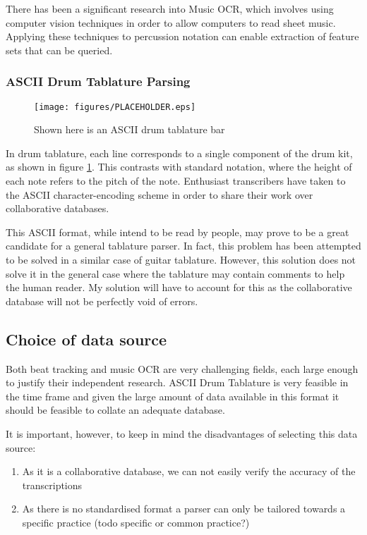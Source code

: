 \documentclass[12pt,twoside,notitlepage]{report}
\begin{document}
		There has been a significant research\cite{Johansen2009}\cite{BainbridgeBell2001} into Music OCR\footnotemark {}, which involves using computer vision techniques in order to allow computers to read sheet music. Applying these techniques to percussion notation can enable extraction of feature sets that can be queried.
		
			\subsubsection{ASCII Drum Tablature Parsing}
						\begin{figure}[h]
			\centerline{\texttt{[image: figures/PLACEHOLDER.eps]}}
			\caption{\label{DrumTablature} Shown here is an ASCII drum tablature bar}
\end{figure}
				In drum tablature, each line corresponds to a single component of the drum kit, as shown in figure \ref{DrumTablature}. This contrasts with standard notation, where the height of each note refers to the pitch of the note. Enthusiast transcribers have taken to the ASCII character-encoding scheme in order to share their work over collaborative databases\footnotemark {}.
				
				This ASCII format, while intend to be read by people, may prove to be a great candidate for a general tablature parser. In fact, this problem has been attempted to be solved in a similar case of guitar tablature\cite{Knowles2013}. However, this solution does not solve it in the general case where the tablature may contain comments to help the human reader. My solution will have to account for this as the collaborative database will not be perfectly void of errors.
		\subsection{\label{subsec:ChoiceOfDataSource}Choice of data source}
		Both beat tracking and music OCR are very challenging fields, each large enough to justify their independent research. ASCII Drum Tablature is very feasible in the time frame and given the large amount of data available in this format it should be feasible to collate an adequate database.
		
		It is important, however, to keep in mind the disadvantages of selecting this data source:
		\begin{enumerate}
			\item{As it is a collaborative database, we can not easily verify the accuracy of the transcriptions}
			\item{As there is no standardised format a parser can only be tailored towards a specific practice (todo specific or common practice?)}
		\end{enumerate}
		
\end{document}
